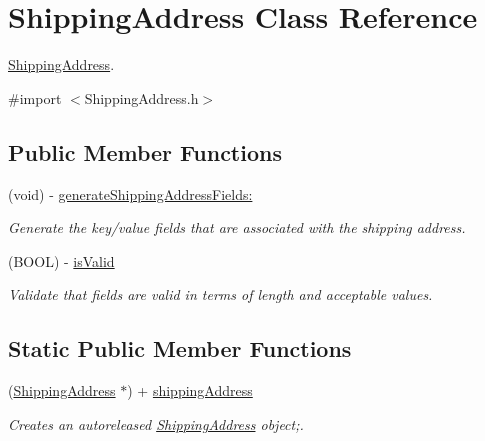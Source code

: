 \hypertarget{interface_shipping_address}{
\section{ShippingAddress Class Reference}
\label{interface_shipping_address}
}


\hyperlink{interface_shipping_address}{ShippingAddress}.  




{\ttfamily \#import $<$ShippingAddress.h$>$}

\subsection*{Public Member Functions}
\begin{DoxyCompactItemize}
\item 
(void) -\/ \hyperlink{interface_shipping_address_aacd441c150b9d29689d8e6f6c257bdda}{generateShippingAddressFields:}
\begin{DoxyCompactList}\small\item\em Generate the key/value fields that are associated with the shipping address. \item\end{DoxyCompactList}\item 
(BOOL) -\/ \hyperlink{interface_shipping_address_a87367fe1cf71f739afd527726d8d9e15}{isValid}
\begin{DoxyCompactList}\small\item\em Validate that fields are valid in terms of length and acceptable values. \item\end{DoxyCompactList}\end{DoxyCompactItemize}
\subsection*{Static Public Member Functions}
\begin{DoxyCompactItemize}
\item 
(\hyperlink{interface_shipping_address}{ShippingAddress} $\ast$) + \hyperlink{interface_shipping_address_a796bbc8193c516c6b26952949f0f2f16}{shippingAddress}
\begin{DoxyCompactList}\small\item\em Creates an autoreleased \hyperlink{interface_shipping_address}{ShippingAddress} object;. \item\end{DoxyCompactList}\end{DoxyCompactItemize}
